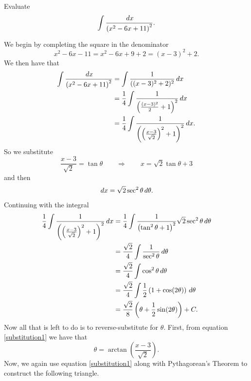 \documentclass[]{ximera}
\begin{document}
\begin{problem}
Evaluate
	\[
	\int \frac{\,d x}{\left( x^2 - 6x + 11 \right)^2}.
	\]
	\begin{freeResponse}
	We begin by completing the square in the denominator
		\[
		x^2 - 6x - 11 = x^2 - 6x + 9 + 2 = (x-3)^2 + 2.
		\]
	We then have that
		\begin{align*}
		\int \frac{\,d x}{\left( x^2 - 6x + 11 \right)^2} 
		&= \int \frac{1}{((x-3)^2 + 2)^2} \,d x  \\
		&= \frac{1}{4} \int \frac{1}{\left( \frac{(x-3)^2}{2} + 1 \right)^2} \,d x  \\
		&= \frac{1}{4} \int \frac{1}{\left( \left( \frac{x-3}{\sqrt{2}} \right)^2 + 1 \right)^2} \,d x.
		\end{align*}
	So we substitute
		\begin{equation}\label{substitution1}
		\frac{x-3}{\sqrt{2}} = \tan \theta	\qquad	\Longrightarrow	\qquad	x = \sqrt{2} \tan \theta + 3
		\end{equation}
	and then
		\[
		\,d x = \sqrt{2} \sec^2 \theta \,d \theta.
		\]
	Continuing with the integral
		\begin{align*}
		\frac{1}{4} \int \frac{1}{\left( \left( \frac{x-3}{\sqrt{2}} \right)^2 + 1 \right)^2} \,d x
		&= \frac{1}{4} \int \frac{1}{\left( \tan^2 \theta + 1 \right)^2} \sqrt{2} \sec^2 \theta \,d \theta  \\
		&= \frac{\sqrt{2}}{4} \int \frac{1}{\sec^2 \theta} \,d \theta  \\
		&= \frac{\sqrt{2}}{4} \int \cos^2 \theta \,d \theta  \\
		&= \frac{\sqrt{2}}{4} \int \frac{1}{2} \left( 1 + \cos(2\theta) \right) \,d \theta  \\
		&= \frac{\sqrt{2}}{8} \left( \theta + \frac{1}{2} \sin(2\theta) \right) + C .
		\end{align*}
	Now all that is left to do is to reverse-substitute for $\theta$.  
	First, from equation \eqref{substitution1} we have that
		\[
		\theta = \arctan \left( \frac{x-3}{\sqrt{2}} \right).
		\]
	Now, we again use equation \eqref{substitution1} along with Pythagorean's Theorem to construct the following triangle.
	

\end{freeResponse}
\end{problem}
\end{document}
